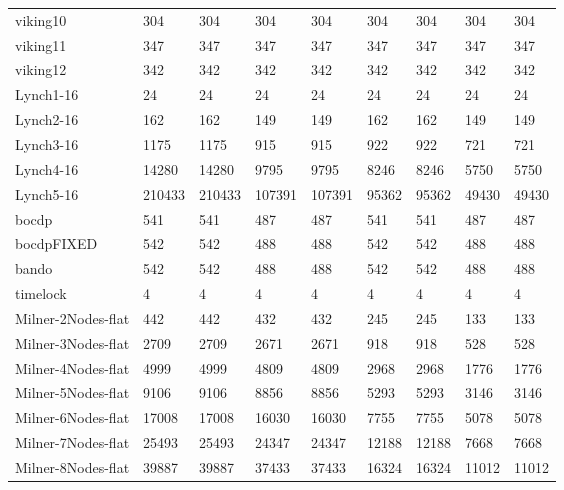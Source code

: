 \begin{table}
\begin{adjustbox}{max totalheight=\textheight}
\begin{tabular}{|l|llllllll|}
    viking10           & 304      & 304      & 304      & 304      & 304   & 304   & 304   & 304   \\
    viking11           & 347      & 347      & 347      & 347      & 347   & 347   & 347   & 347   \\
    viking12           & 342      & 342      & 342      & 342      & 342   & 342   & 342   & 342   \\ \hline
    Lynch1-16          & 24       & 24       & 24       & 24       & 24    & 24    & 24    & 24    \\
    Lynch2-16          & 162      & 162      & 149      & 149      & 162   & 162   & 149   & 149   \\
    Lynch3-16          & 1175     & 1175     & 915      & 915      & 922   & 922   & 721   & 721   \\
    Lynch4-16          & 14280    & 14280    & 9795     & 9795     & 8246  & 8246  & 5750  & 5750  \\
    Lynch5-16          & 210433   & 210433   & 107391   & 107391   & 95362 & 95362 & 49430 & 49430 \\ \hline
    bocdp              & 541      & 541      & 487      & 487      & 541   & 541   & 487   & 487   \\
    bocdpFIXED         & 542      & 542      & 488      & 488      & 542   & 542   & 488   & 488   \\
    bando              & 542      & 542      & 488      & 488      & 542   & 542   & 488   & 488   \\
    timelock           & 4        & 4        & 4        & 4        & 4     & 4     & 4     & 4     \\ \hline
    Milner-2Nodes-flat & 442      & 442      & 432      & 432      & 245   & 245   & 133   & 133   \\
    Milner-3Nodes-flat & 2709     & 2709     & 2671     & 2671     & 918   & 918   & 528   & 528   \\
    Milner-4Nodes-flat & 4999     & 4999     & 4809     & 4809     & 2968  & 2968  & 1776  & 1776  \\
    Milner-5Nodes-flat & 9106     & 9106     & 8856     & 8856     & 5293  & 5293  & 3146  & 3146  \\
    Milner-6Nodes-flat & 17008    & 17008    & 16030    & 16030    & 7755  & 7755  & 5078  & 5078  \\
    Milner-7Nodes-flat & 25493    & 25493    & 24347    & 24347    & 12188 & 12188 & 7668  & 7668  \\
    Milner-8Nodes-flat & 39887    & 39887    & 37433    & 37433    & 16324 & 16324 & 11012 & 11012 \\ \hline

\end{tabular}
\end{adjustbox}
\end{table}
